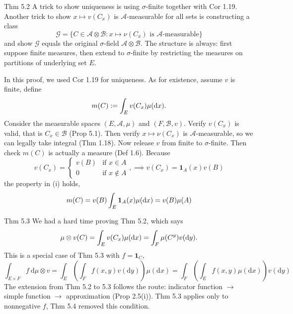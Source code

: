 \begin{note}{Thm 5.2}
    A trick to show uniqueness is using $\sigma$-finite together with Cor 1.19. Another trick to show $x \mapsto v\left(C_{x}\right)$ is $\mathcal{A}$-measurable for all sets is constructing a class
    \[
    \mathcal{G} = \{ C \in \mathcal{A} \otimes \mathcal{B} : x \mapsto \nu(C_x) \text{ is } \mathcal{A}\text{-measurable} \}
    \]
    and show $\mathcal{G}$ equals the original $\sigma$-field $\mathcal{A}\otimes \mathcal{B}$. The structure is always: first suppose finite measures, then extend to $\sigma$-finite by restricting the measures on partitions of underlying set $E$.

    In this proof, we used Cor 1.19 for uniqueness. As for existence, assume $v$ is finite, define
    \[
    m(C):=\int_E v(C_x)\mu(\mathop{}\!\mathrm{d} x).
    \]
    Consider the measurable spaces $(E,\mathcal{A},\mu)$ and $(F,\mathcal{B},v)$. Verify $v(C_x)$ is valid, that is $C_x\in \mathcal{B}$ (Prop 5.1). Then verify $x\mapsto\nu\left(C_{x}\right)$ is $\mathcal{A}$-measurable, so we can legally take integral (Thm 1.18). Now release $v$ from finite to $\sigma$-finite. Then check $m(C)$ is actually a measure (Def 1.6). Because 
    \[
    v(C_x)=\begin{cases}
        v(B) & \text{if }x\in A\\
        0 & \text{if }x\notin A
    \end{cases},\implies v(C_x)=\mathbf{1}_A(x) v(B)
    \]
    the property in (i) holds,
    \[
    m(C)=v(B)\int_E \mathbf{1}_A(x) \mu(\mathop{}\!\mathrm{d} x)=v(B)\mu(A)
    \]
\end{note}

\begin{note}{Thm 5.3}
    We had a hard time proving Thm 5.2, which says
    \[
    \mu\otimes v(C)=\int_E v(C_x)\mu(\mathop{}\!\mathrm{d} x)=\int_F \mu(C^y)v(\mathop{}\!\mathrm{d} y).
    \]
    This is a special case of Thm 5.3 with $f=\mathbf{1}_{C}$, 
    \[
    \int_{E \times F} f \mathrm{~d} \mu \otimes v=\int_{E}\left(\int_{F} f(x, y) v(\mathrm{d} y)\right) \mu(\mathrm{d} x)=\int_{F}\left(\int_{E} f(x, y) \mu(\mathrm{d} x)\right) v(\mathrm{d} y)
    \]
    The extension from Thm 5.2 to 5.3 follows the route: indicator function $\to$ simple function $\to$ approximation (Prop 2.5(i)). Thm 5.3 applies only to nonnegative $f$, Thm 5.4 removed this condition. 
\end{note}

